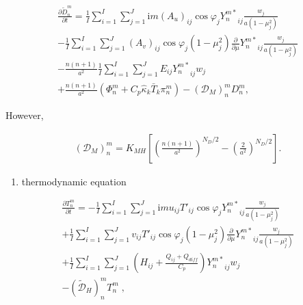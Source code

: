 \begin{eqnarray}
  \frac{\partial{\tilde{D}_n^m}}{\partial {t}} 
   =  \frac{1}{I} \sum_{i=1}^{I} \sum_{j=1}^{J}  
          \mathrm{i}m (A_u)_{ij} \cos\varphi_j
          {Y_n^{m *}}_{ij}
         \frac{w_j}{a(1-\mu_j^{2})} 
          \\
    -    \frac{1}{I} \sum_{i=1}^{I} \sum_{j=1}^{J}  
          (A_v)_{ij} \cos\varphi_j
          (1-\mu_j^2) 
          \frac{\partial }{\partial \mu} {Y_n^{m *}}_{ij}
          \frac{w_j}{a(1-\mu_j^{2})} 
          \\
    -   \frac{n(n+1)}{a^{2}} 
         \frac{1}{I} \sum_{i=1}^{I} \sum_{j=1}^{J}  
          E_{ij} {Y_n^{m *}}_{ij} w_j
          \\ 
    +   \frac{n(n+1)}{a^{2}} 
          ( \Phi_n^m + C_{p} \hat{\kappa}_k \bar{T}_k \pi_n^m ) 
          -  ({\mathcal D}_M)_n^m D_n^m  ,
\end{eqnarray}

However,

\begin{eqnarray}
({\mathcal D}_M)_n^m = K_{MH} \left[ 
                            \left( \frac{n(n+1)}{a^{2}} \right)^{N_D/2}
                            - \left( \frac{2}{a^2} \right)^{N_D/2}
                            \right]  .
\end{eqnarray}

\begin{enumerate}
\def\labelenumi{\arabic{enumi}.}
\setcounter{enumi}{2}
\tightlist
\item
  thermodynamic equation
\end{enumerate}

\begin{eqnarray}
  \frac{\partial{T_n^m}}{\partial {t}}
   =  - \frac{1}{I} \sum_{i=1}^{I} \sum_{j=1}^{J}  
          \mathrm{i}m u_{ij} T'_{ij} \cos\varphi_j
          {Y_n^{m *}}_{ij}
         \frac{w_j}{a(1-\mu_j^{2})} 
          \\
     + \frac{1}{I} \sum_{i=1}^{I} \sum_{j=1}^{J}  
          v_{ij} T'_{ij} \cos\varphi_j
          (1-\mu_j^2) 
          \frac{\partial }{\partial \mu} {Y_n^{m *}}_{ij}
          \frac{w_j}{a(1-\mu_j^{2})} 
          \\
     + \frac{1}{I} \sum_{i=1}^{I} \sum_{j=1}^{J}  
          \left( H_{ij} + \frac{Q_{ij}+Q_{diff}}{C_{p}} \right)
          {Y_n^{m *}}_{ij} w_j
          \\ 
     - (\tilde{\mathcal D}_H)_n^m T_n^m \; ,
\end{eqnarray}

